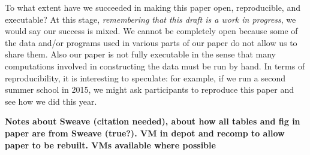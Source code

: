 To what extent have we succeeded in making this paper open, reproducible, and executable?  At this stage,
\emph{remembering that this draft is a work in progress}, we would say our success is mixed.  We cannot be completely open because
some of the data and/or programs used in various parts of our paper do not allow us to share them.  Also our paper is not fully executable in the sense that many 
computations involved in constructing the data must be run by hand.   In terms of reproducibility, it is interesting to speculate: for example, if we run a second summer school in 2015, we might ask participants to reproduce this paper and see how we did this year.



\textbf{Notes about Sweave (citation needed), about how all tables and fig in paper are from Sweave (true?).  
VM in depot and recomp to allow paper to be rebuilt.
VMs available where possible}


